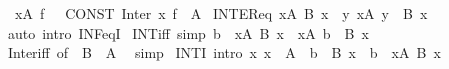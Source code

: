 \begin{isabellebody}
\ \ {\isachardoublequoteopen}{\isasymInter}x{\isasymin}A{\isachardot}{\kern0pt}\ f{\isachardoublequoteclose}\ \ {\isasymrightleftharpoons}\ {\isachardoublequoteopen}CONST\ Inter\ {\isacharparenleft}{\kern0pt}{\isacharparenleft}{\kern0pt}{\isasymlambda}x{\isachardot}{\kern0pt}\ f{\isacharparenright}{\kern0pt}\ {\isacharbackquote}{\kern0pt}\ A{\isacharparenright}{\kern0pt}{\isachardoublequoteclose}\isanewline
\isanewline
{}\isamarkupfalse%
\ INTER{\isacharunderscore}{\kern0pt}eq{\isacharcolon}{\kern0pt}\ {\isachardoublequoteopen}{\isacharparenleft}{\kern0pt}{\isasymInter}x{\isasymin}A{\isachardot}{\kern0pt}\ B\ x{\isacharparenright}{\kern0pt}\ {\isacharequal}{\kern0pt}\ {\isacharbraceleft}{\kern0pt}y{\isachardot}{\kern0pt}\ {\isasymforall}x{\isasymin}A{\isachardot}{\kern0pt}\ y\ {\isasymin}\ B\ x{\isacharbraceright}{\kern0pt}{\isachardoublequoteclose}\isanewline
%
\isadelimproof
\ \ %
\endisadelimproof
%
\isatagproof
{}\isamarkupfalse%
\ {\isacharparenleft}{\kern0pt}auto\ intro{\isacharbang}{\kern0pt}{\isacharcolon}{\kern0pt}\ INF{\isacharunderscore}{\kern0pt}eqI{\isacharparenright}{\kern0pt}%
\endisatagproof
{\isafoldproof}%
%
\isadelimproof
\isanewline
%
\endisadelimproof
\isanewline
{}\isamarkupfalse%
\ INT{\isacharunderscore}{\kern0pt}iff\ {\isacharbrackleft}{\kern0pt}simp{\isacharbrackright}{\kern0pt}{\isacharcolon}{\kern0pt}\ {\isachardoublequoteopen}b\ {\isasymin}\ {\isacharparenleft}{\kern0pt}{\isasymInter}x{\isasymin}A{\isachardot}{\kern0pt}\ B\ x{\isacharparenright}{\kern0pt}\ {\isasymlongleftrightarrow}\ {\isacharparenleft}{\kern0pt}{\isasymforall}x{\isasymin}A{\isachardot}{\kern0pt}\ b\ {\isasymin}\ B\ x{\isacharparenright}{\kern0pt}{\isachardoublequoteclose}\isanewline
%
\isadelimproof
\ \ %
\endisadelimproof
%
\isatagproof
{}\isamarkupfalse%
\ Inter{\isacharunderscore}{\kern0pt}iff\ {\isacharbrackleft}{\kern0pt}of\ {\isacharunderscore}{\kern0pt}\ {\isachardoublequoteopen}B\ {\isacharbackquote}{\kern0pt}\ A{\isachardoublequoteclose}{\isacharbrackright}{\kern0pt}\ \isamarkupfalse%
\ simp%
\endisatagproof
{\isafoldproof}%
%
\isadelimproof
\isanewline
%
\endisadelimproof
\isanewline
{}\isamarkupfalse%
\ INT{\isacharunderscore}{\kern0pt}I\ {\isacharbrackleft}{\kern0pt}intro{\isacharbang}{\kern0pt}{\isacharbrackright}{\kern0pt}{\isacharcolon}{\kern0pt}\ {\isachardoublequoteopen}{\isacharparenleft}{\kern0pt}{\isasymAnd}x{\isachardot}{\kern0pt}\ x\ {\isasymin}\ A\ {\isasymLongrightarrow}\ b\ {\isasymin}\ B\ x{\isacharparenright}{\kern0pt}\ {\isasymLongrightarrow}\ b\ {\isasymin}\ {\isacharparenleft}{\kern0pt}{\isasymInter}x{\isasymin}A{\isachardot}{\kern0pt}\ B\ x{\isacharparenright}{\kern0pt}{\isachardoublequoteclose}\isanewline

\end{isabellebody}
